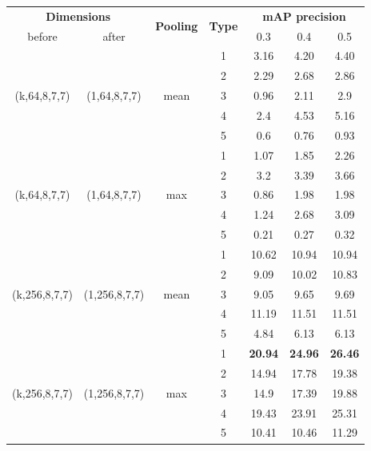 \documentclass{report}
\begin{document}
\begin{center}
\begin{longtable}{||c | c | c| c||c c c||}

  \hline
  \multicolumn{2}{||c|}{\textbf{Dimensions}} & \multirow{2}{*}{ \textbf{Pooling}} &\multirow{2}{*}{\textbf{Type}} & \multicolumn{3}{|c||}{\textbf{mAP precision}}\\

   before & after &  {} & {} &  0.3 &  0.4 & 0.5 \\
 \hline   \hline
 \multirow{5}{*}{(k,64,8,7,7)} & \multirow{5}{*}{(1,64,8,7,7)} & \multirow{5}{*}{mean}  & 1 &  3.16 & 4.20 & 4.40    \\
  \cline{4-7}
  {} & {} & {} & 2 &  2.29 & 2.68 & 2.86    \\
    \cline{4-7}
  {} & {} & {} & 3 & 0.96 & 2.11 & 2.9     \\
    \cline{4-7}
  {} & {} & {} & 4 &  2.4  & 4.53 & 5.16    \\
    \cline{4-7}
  {} & {} & {} & 5 &  0.6  & 0.76 & 0.93    \\
  \hline
 \multirow{5}{*}{(k,64,8,7,7)} & \multirow{5}{*}{(1,64,8,7,7)} & \multirow{5}{*}{max}  & 1 &  1.07 & 1.85 & 2.26    \\
    \cline{4-7}
  {} & {} & {} & 2 &  3.2 & 3.39 & 3.66    \\
    \cline{4-7}
  {} & {} & {} & 3 &  0.86 & 1.98 & 1.98    \\
    \cline{4-7}
  {} & {} & {} & 4 &  1.24 & 2.68 & 3.09    \\
    \cline{4-7}
  {} & {} & {} & 5 &  0.21 & 0.27 & 0.32    \\

  \hline   \hline

 \multirow{5}{*}{(k,256,8,7,7)} & \multirow{5}{*}{(1,256,8,7,7)} & \multirow{5}{*}{mean}  & 1 &  10.62 & 10.94 & 10.94    \\

    \cline{4-7}
  {} & {} & {} & 2 &  9.09  & 10.02 & 10.83   \\
    \cline{4-7}
  {} & {} & {} & 3 &  9.05  & 9.65  & 9.69    \\
    \cline{4-7}
  {} & {} & {} & 4 &  11.19 & 11.51 & 11.51   \\
    \cline{4-7}
  {} & {} & {} & 5 &  4.84  & 6.13  & 6.13   \\
    \hline
 \multirow{5}{*}{(k,256,8,7,7)} & \multirow{5}{*}{(1,256,8,7,7)} & \multirow{5}{*}{max}  & 1  & \bf 20.94 & \bf 24.96 & \bf 26.46   \\
    \cline{4-7}
  {} & {} & {} & 2  & 14.94 & 17.78 & 19.38   \\
    \cline{4-7}
  {} & {} & {} & 3  & 14.9 & 17.39 & 19.88   \\
    \cline{4-7}
  {} & {} & {} & 4  & 19.43 & 23.91 & 25.31   \\
    \cline{4-7}
  {} & {} & {} & 5  & 10.41 & 10.46 & 11.29   \\
  \hline   
  

\end{longtable}
\end{center}
\end{document}
